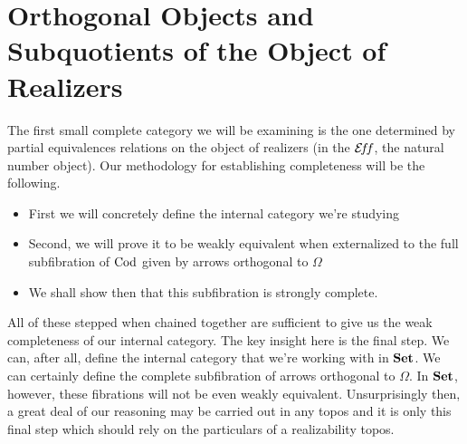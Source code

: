 \section{Orthogonal Objects and Subquotients of the Object of Realizers}\label{sec:orth}

The first small complete category we will be examining is the one
determined by partial equivalences relations on the object of
realizers (in the $\mathcal{E}\!f\!f$, the natural number object). Our methodology
for establishing completeness will be the following.
\begin{itemize}
\item First we will concretely define the internal category we're
  studying
\item Second, we will prove it to be weakly equivalent when
  externalized to the full subfibration of $\operatorname{Cod}$ given by arrows
  orthogonal to $\Omega$
\item We shall show then that this subfibration is strongly complete.
\end{itemize}
All of these stepped when chained together are sufficient to give us
the weak completeness of our internal category. The key insight here
is the final step. We can, after all, define the internal category
that we're working with in $\mathbf{Set}$. We can certainly define the
complete subfibration of arrows orthogonal to $\Omega$. In $\mathbf{Set}$,
however, these fibrations will not be even weakly
equivalent. Unsurprisingly then, a great deal of our reasoning may be
carried out in any topos and it is only this final step which should
rely on the particulars of a realizability topos.

